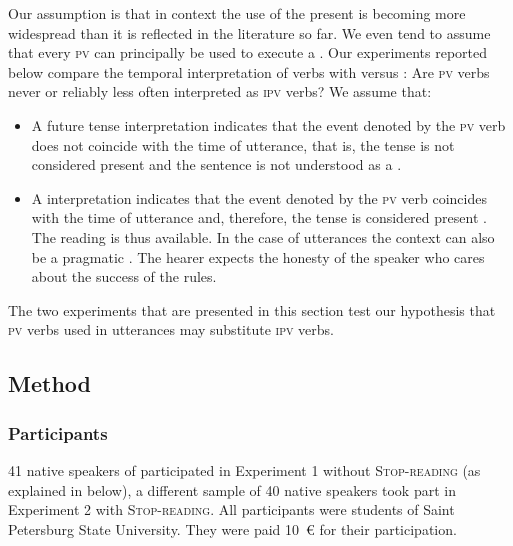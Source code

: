 \documentclass[output=paper,colorlinks,citecolor=brown,newtxmath,hidelinks]{langscibook}
\begin{document}
Our assumption is that in  context the use of the present  is becoming more widespread than it is reflected in the literature so far. We even tend to assume that every \textsc{pv}  can principally be used to execute a . Our experiments reported below compare the temporal interpretation of  verbs with  versus : Are \textsc{pv}  verbs never or reliably less often interpreted as  \textsc{ipv}  verbs? We assume that:

\begin{itemize}
\item A future tense interpretation indicates that the event denoted by the \textsc{pv} verb does not coincide with the time of utterance, that is, the tense is not considered present  and the sentence is not understood as a .
\item A  interpretation indicates that the event denoted by the \textsc{pv} verb coincides with the time of utterance and, therefore, the tense is considered present . The  reading is thus available. In the case of  utterances the context can also be a pragmatic . The hearer expects the honesty of the speaker who cares about the success of the rules.
\end{itemize}

The two experiments that are presented in this section test our hypothesis that \textsc{pv}  verbs used in  utterances may substitute \textsc{ipv} verbs. 

\subsection{Method}

\subsubsection{Participants}

41 native speakers of  participated in Experiment 1 without \textsc{Stop-reading} (as explained in  below), a different sample of 40  native speakers took part in Experiment 2 with \textsc{Stop-reading}. All participants were students of Saint Petersburg State University. They were paid 10~{\small\euro} for their participation.
\end{document}
